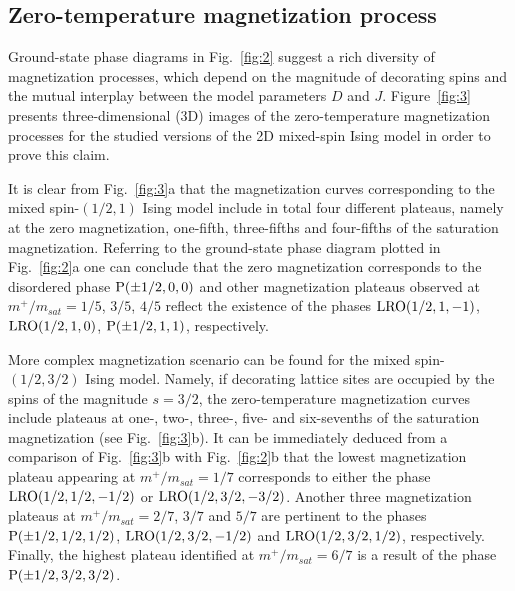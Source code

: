 \documentclass[final,5p,times,sort&compress]{elsarticle}
\begin{document}
\subsection{Zero-temperature magnetization process}
\label{subsec:32}

Ground-state phase diagrams in Fig.~\ref{fig:2} suggest a rich diversity of magnetization processes, which depend on the magnitude of decorating spins and the mutual interplay between the model parameters $D$ and $J$. Figure~\ref{fig:3} presents three-dimensional (3D) images of the zero-temperature magnetization processes for the studied versions of the 2D mixed-spin Ising model in order to prove this claim.

It is clear from Fig.~\ref{fig:3}a that the magnetization curves corresponding to the mixed spin-$(1/2,1)$ Ising model include in total four different plateaus, namely at the zero magnetization, one-fifth, three-fifths and four-fifths of the saturation magnetization. Referring to the ground-state phase diagram plotted in Fig.~\ref{fig:2}a one can conclude that the zero magnetization corresponds to the disordered phase ${\rm P}(\pm1/2, 0,0)$ and other magnetization plateaus observed at $m^+/m_{sat}= 1/5$, $3/5$, $4/5$ reflect the existence of the phases ${\rm LRO}(1/2, 1,-1)$, ${\rm LRO}(1/2, 1,0)$, ${\rm P}(\pm1/2, 1,1)$, respectively.

More complex magnetization scenario can be found for the mixed spin-$(1/2,3/2)$ Ising model. Namely, if decorating lattice sites are occupied by the spins of the magnitude $s=3/2$, the zero-temperature magnetization curves include plateaus at one-, two-, three-, five- and six-sevenths of the saturation magnetization (see Fig.~\ref{fig:3}b). It can be immediately deduced from a comparison of Fig.~\ref{fig:3}b with Fig.~\ref{fig:2}b that the lowest magnetization plateau appearing at $m^+/m_{sat}=1/7$ corresponds to either the phase ${\rm LRO}(1/2, 1/2, -1/2)$ or ${\rm LRO}(1/2, 3/2, -3/2)$. Another three magnetization plateaus at $m^+/m_{sat}=2/7$, $3/7$ and $5/7$ are pertinent to the phases ${\rm P}(\pm1/2, 1/2, 1/2)$, \linebreak ${\rm LRO}(1/2, 3/2,-1/2)$ and ${\rm LRO}(1/2, 3/2, 1/2)$, respectively. Finally, the highest plateau identified at $m^+/m_{sat}= 6/7$ is a result of the phase ${\rm P}(\pm1/2, 3/2, 3/2)$.
\end{document}
